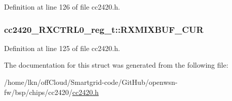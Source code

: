 Definition at line 126 of file cc2420.\+h.

\subsubsection[{\texorpdfstring{R\+X\+M\+I\+X\+B\+U\+F\+\_\+\+C\+UR}{RXMIXBUF_CUR}}]{ cc2420\+\_\+\+R\+X\+C\+T\+R\+L0\+\_\+reg\+\_\+t\+::\+R\+X\+M\+I\+X\+B\+U\+F\+\_\+\+C\+UR}\hypertarget{structcc2420___r_x_c_t_r_l0__reg__t_a89b8596f6ee46f26fe2db5790141ec6d}{}\label{structcc2420___r_x_c_t_r_l0__reg__t_a89b8596f6ee46f26fe2db5790141ec6d}


Definition at line 125 of file cc2420.\+h.



The documentation for this struct was generated from the following file\+:\begin{DoxyCompactItemize}
\item 
/home/lkn/off\+Cloud/\+Smartgrid-\/code/\+Git\+Hub/openwsn-\/fw/bsp/chips/cc2420/\hyperlink{cc2420_8h}{cc2420.\+h}\end{DoxyCompactItemize}
